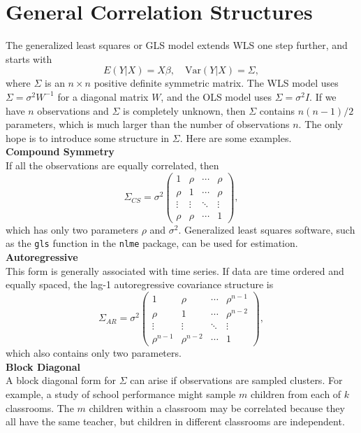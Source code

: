 \documentclass[14pt]{extarticle}
\begin{document}
\section*{General Correlation Structures}
\noindent
The generalized least squares or GLS model extends WLS one step further, and starts with
\[
E(Y | X) = X \beta, \quad \text{Var}(Y | X) = \Sigma,
\]
where \( \Sigma \) is an \( n \times n \) positive definite symmetric matrix. The WLS model uses \( \Sigma = \sigma^2 W^{-1} \) for a diagonal matrix \( W \), and the OLS model uses \( \Sigma = \sigma^2 I \).
If we have \( n \) observations and \( \Sigma \) is completely unknown, then \( \Sigma \) contains \( n(n - 1)/2 \) parameters, which is much larger than the number of observations \( n \). The only hope is to introduce some structure in \( \Sigma \). Here are some examples.\\
\textbf{Compound Symmetry}\\
If all the observations are equally correlated, then
\[
\Sigma_{CS} = \sigma^2 \begin{pmatrix} 
1 & \rho & \cdots & \rho \\
\rho & 1 & \cdots & \rho \\
\vdots & \vdots & \ddots & \vdots \\
\rho & \rho & \cdots & 1 
\end{pmatrix},
\]
\noindent
which has only two parameters \( \rho \) and \( \sigma^2 \). Generalized least squares software, such as the \texttt{gls} function in the \texttt{nlme} package, can be used for estimation.\\
\textbf{Autoregressive} \\
This form is generally associated with time series. If data are time ordered and equally spaced, the lag-1 autoregressive covariance structure is
\[
\Sigma_{AR} = \sigma^2 \begin{pmatrix} 
1 & \rho & \cdots & \rho^{n-1} \\
\rho & 1 & \cdots & \rho^{n-2} \\
\vdots & \vdots & \ddots & \vdots \\
\rho^{n-1} & \rho^{n-2} & \cdots & 1 
\end{pmatrix},
\]
which also contains only two parameters.\\
\textbf{Block Diagonal} \\
A block diagonal form for \( \Sigma \) can arise if observations are sampled clusters. For example, a study of school performance might sample \( m \) children from each of \( k \) classrooms. The \( m \) children within a classroom may be correlated because they all have the same teacher, but children in different classrooms are independent.
\end{document}
